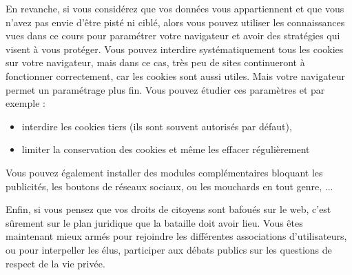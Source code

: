 \documentclass[12pt]{article}
\begin{document}
En revanche, si vous considérez que vos données vous appartiennent et
que vous n'avez pas envie d'être pisté ni ciblé, alors vous pouvez
utiliser les connaissances vues dans ce cours pour paramétrer votre
navigateur et avoir des stratégies qui visent à vous protéger. Vous
pouvez interdire systématiquement tous les cookies sur votre
navigateur, mais dans ce cas, très peu de sites continueront à
fonctionner correctement, car les cookies sont aussi utiles. Mais
votre navigateur permet un paramétrage plus fin. Vous pouvez étudier
ces paramètres et  par exemple :

\begin{itemize}
\item interdire les cookies tiers (ils sont souvent autorisés par
  défaut),
\item limiter la conservation des cookies et même les effacer
  régulièrement
\end{itemize}

Vous pouvez également installer des modules complémentaires bloquant
les publicités, les boutons de réseaux sociaux, ou les mouchards en
tout genre, ...

Enfin, si vous pensez que vos droits de citoyens sont bafoués sur le
web, c'est sûrement sur le plan juridique que la bataille doit avoir
lieu. Vous êtes maintenant mieux armés pour rejoindre les différentes
associations d'utilisateurs, ou pour interpeller les élus, participer
aux débats publics sur les questions de respect de la vie privée. 
\end{document}
